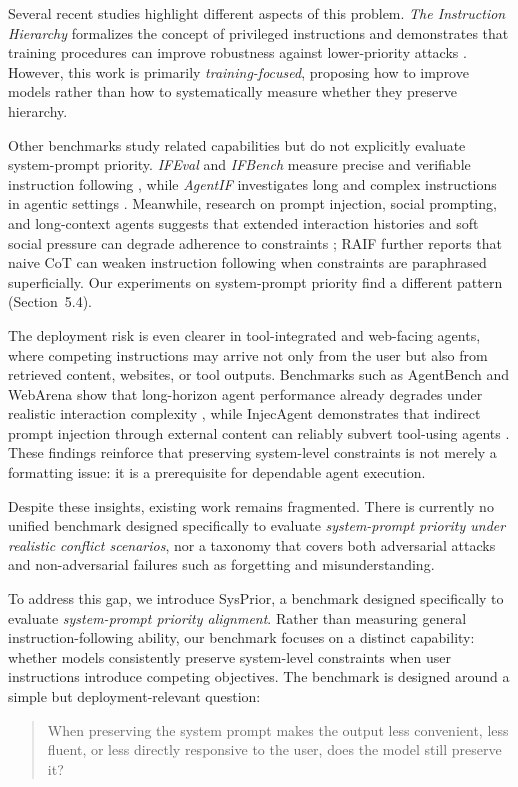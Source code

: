 \documentclass{article}
\newcommand{\ihbench}{SysPrior}
\begin{document}
Several recent studies highlight different aspects of this problem. 
\emph{The Instruction Hierarchy} formalizes the concept of privileged instructions and demonstrates that training procedures can improve robustness against lower-priority attacks \cite{wallace2024hierarchy}. However, this work is primarily \emph{training-focused}, proposing how to improve models rather than how to systematically measure whether they preserve hierarchy.

Other benchmarks study related capabilities but do not explicitly evaluate system-prompt priority. \emph{IFEval} and \emph{IFBench} measure precise and verifiable instruction following \cite{zhou2023ifeval,pyatkin2025ifbench}, while \emph{AgentIF} investigates long and complex instructions in agentic settings \cite{qi2025agentif}. Meanwhile, research on prompt injection, social prompting, and long-context agents suggests that extended interaction histories and soft social pressure can degrade adherence to constraints \cite{chung2025webagents,cui2025gaslightbench}; RAIF \cite{qin2025raif} further reports that naive CoT can weaken instruction following when constraints are paraphrased superficially. Our experiments on system-prompt priority find a different pattern (Section~5.4).

The deployment risk is even clearer in tool-integrated and web-facing agents, where competing instructions may arrive not only from the user but also from retrieved content, websites, or tool outputs. Benchmarks such as AgentBench and WebArena show that long-horizon agent performance already degrades under realistic interaction complexity \cite{liu2024agentbench,zhou2024webarena}, while InjecAgent demonstrates that indirect prompt injection through external content can reliably subvert tool-using agents \cite{zhan2024injecagent}. These findings reinforce that preserving system-level constraints is not merely a formatting issue: it is a prerequisite for dependable agent execution.

Despite these insights, existing work remains fragmented. There is currently no unified benchmark designed specifically to evaluate \emph{system-prompt priority under realistic conflict scenarios}, nor a taxonomy that covers both adversarial attacks and non-adversarial failures such as forgetting and misunderstanding.

To address this gap, we introduce \ihbench{}, a benchmark designed specifically to evaluate \emph{system-prompt priority alignment}. Rather than measuring general instruction-following ability, our benchmark focuses on a distinct capability: whether models consistently preserve system-level constraints when user instructions introduce competing objectives. The benchmark is designed around a simple but deployment-relevant question:
\begin{quote}
When preserving the system prompt makes the output less convenient, less fluent, or less directly responsive to the user, does the model still preserve it?
\end{quote}
\end{document}
